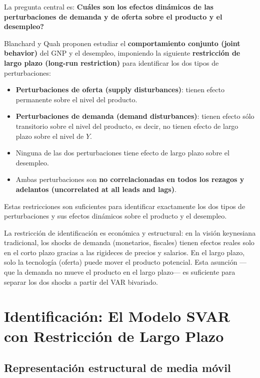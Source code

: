 \documentclass[12pt]{article}
\begin{document}
La pregunta central es: \textbf{\textquestiondown Cu\'ales son los efectos din\'amicos de las perturbaciones de demanda y de oferta sobre el producto y el desempleo?}

Blanchard y Quah proponen estudiar el \textbf{comportamiento conjunto (joint behavior)} del GNP y el desempleo, imponiendo la siguiente \textbf{restricci\'on de largo plazo (long-run restriction)} para identificar los dos tipos de perturbaciones:

\begin{itemize}
  \item \textbf{Perturbaciones de oferta (supply disturbances)}: tienen efecto permanente sobre el nivel del producto.
  \item \textbf{Perturbaciones de demanda (demand disturbances)}: tienen efecto s\'olo transitorio sobre el nivel del producto, es decir, no tienen efecto de largo plazo sobre el nivel de $Y$.
  \item Ninguna de las dos perturbaciones tiene efecto de largo plazo sobre el desempleo.
  \item Ambas perturbaciones son \textbf{no correlacionadas en todos los rezagos y adelantos (uncorrelated at all leads and lags)}.
\end{itemize}

Estas restricciones son suficientes para identificar exactamente los dos tipos de perturbaciones y sus efectos din\'amicos sobre el producto y el desempleo.

\begin{intuicion}
La restricci\'on de identificaci\'on es econ\'omica y estructural: en la visi\'on keynesiana tradicional, los shocks de demanda (monetarios, fiscales) tienen efectos reales solo en el corto plazo gracias a las rigideces de precios y salarios. En el largo plazo, solo la tecnolog\'ia (oferta) puede mover el producto potencial. Esta asunci\'on ---que la demanda no mueve el producto en el largo plazo--- es suficiente para separar los dos shocks a partir del VAR bivariado.
\end{intuicion}

\section{Identificaci\'on: El Modelo SVAR con Restricci\'on de Largo Plazo}

\subsection{Representaci\'on estructural de media m\'ovil}
\end{document}
